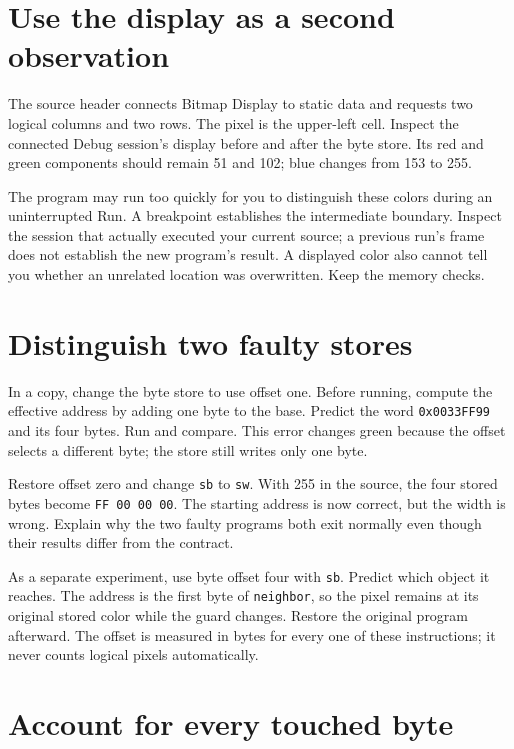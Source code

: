 \clearpage


\section{Use the display as a second observation}

The source header connects Bitmap Display to static data and requests two logical
columns and two rows. The pixel is the upper-left cell. Inspect the connected
Debug session's display before and after the byte store. Its red and green
components should remain 51 and 102; blue changes from 153 to 255.

The program may run too quickly for you to distinguish these colors during an
uninterrupted Run. A breakpoint establishes the intermediate boundary. Inspect
the session that actually executed your current source; a previous run's frame
does not establish the new program's result. A displayed color also cannot tell
you whether an unrelated location was overwritten. Keep the memory checks.

\section{Distinguish two faulty stores}

In a copy, change the byte store to use offset one. Before running, compute the
effective address by adding one byte to the base. Predict the word
\texttt{0x0033FF99} and its four bytes. Run and compare. This error changes green
because the offset selects a different byte; the store still writes only one byte.

Restore offset zero and change \texttt{sb} to \texttt{sw}. With 255 in the source,
the four stored bytes become \texttt{FF 00 00 00}. The starting address is now
correct, but the width is wrong. Explain why the two faulty programs both exit
normally even though their results differ from the contract.

As a separate experiment, use byte offset four with \texttt{sb}. Predict which
object it reaches. The address is the first byte of \texttt{neighbor}, so the
pixel remains at its original stored color while the guard changes. Restore the
original program afterward. The offset is measured in bytes for every one of
these instructions; it never counts logical pixels automatically.

\section{Account for every touched byte}

